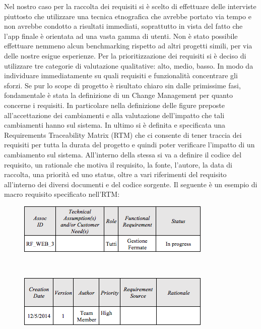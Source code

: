 Nel nostro caso per la raccolta dei requisiti si \`{e} scelto di effettuare delle interviste piuttosto che utilizzare una tecnica etnografica che avrebbe portato via tempo e non avrebbe condotto a risultati immediati, soprattutto in vista del fatto che l\rq app finale \`{e} orientata ad una vasta gamma di utenti. Non \`{e} stato possibile effettuare nemmeno alcun benchmarking rispetto ad altri progetti simili, per via delle nostre esigue esperienze.
Per la prioritizzazione dei requisiti si \`{e} deciso di utilizzare tre categorie di valutazione qualitative: alto, medio, basso. In modo da individuare immediatamente su quali requisiti e funzionalit\`{a} concentrare gli sforzi. 
Se pur lo scope di progetto \`{e} risultato chiaro sin dalle primissime fasi, fondamentale \`{e} stata la definizione di un Change Management per quanto concerne i requisiti. In particolare nella definizione delle figure preposte all\rq accettazione dei cambiamenti e alla valutazione dell\rq impatto che tali cambiamenti hanno sul sistema.
In ultimo si \`{e} definita e specificata una Requirements Traceability Matrix (RTM) che ci consente di tener traccia dei requisiti per tutta la durata del progetto e quindi poter verificare l\rq impatto di un cambiamento sul sistema. 
All\rq interno della stessa si va a definire il codice del requisito, un rationale che motiva il requisito, la fonte, l\rq autore, la data di raccolta, una priorit\`{a} ed uno status, oltre a vari riferimenti del requisito all\rq interno dei diversi documenti e del codice sorgente.
Il seguente \`{e} un esempio di macro requisito specificato nell\rq RTM:
\\
\begin{figure}[h]
\centering
\includegraphics[scale=.7]{img/1.png}
\label{fig:cd}
\end{figure}
\\
\begin{figure}[h]
\centering
\includegraphics[scale=.7]{img/2.png}
\label{fig:cd}
\end{figure}
